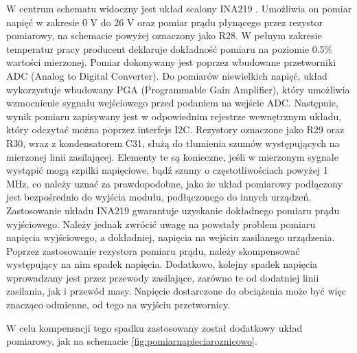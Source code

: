 W centrum schematu widoczny jest układ scalony INA219 \cite{ina219}. Umożliwia on pomiar napięć w zakresie 0 V do 26 V oraz pomiar prądu płynącego przez rezystor pomiarowy, na schemacie powyżej oznaczony 
jako R28.
W pełnym zakresie temperatur pracy producent deklaruje dokładność pomiaru na poziomie 0.5\% wartości mierzonej.
Pomiar dokonywany jest poprzez wbudowane przetworniki ADC (Analog to Digital Converter). Do pomiarów niewielkich napięć, układ wykorzystuje wbudowany 
PGA (Programmable Gain Amplifier), który umożliwia wzmocnienie sygnału wejściowego przed podaniem na wejście ADC. 
Następnie, wynik pomiaru zapisywany jest w odpowiednim rejestrze wewnętrznym układu, który odczytać można poprzez interfejs I2C.
Rezystory oznaczone jako R29 oraz R30, wraz z kondensatorem C31, służą do tłumienia szumów występujących na mierzonej linii zasilającej.
Elementy te są konieczne, jeśli w mierzonym sygnale wystąpić mogą szpilki napięciowe, bądź szumy o częstotliwościach powyżej 1 MHz, co należy uznać za prawdopodobne, jako że układ pomiarowy podłączony jest bezpośrednio do wyjścia 
modułu, podłączonego do innych urządzeń. \\


Zastosowanie układu INA219 gwarantuje uzyskanie dokładnego pomiaru prądu wyjściowego. Należy jednak zwrócić uwagę na powstały problem pomiaru napięcia wyjściowego, a dokładniej, napięcia na wejściu zasilanego urządzenia.
Poprzez zastosowanie rezystora pomiaru prądu, należy skompensować występujący na nim spadek napięcia. Dodatkowo, kolejny spadek napięcia wprowadzany jest przez przewody zasilające, 
zarówno te od dodatniej linii zasilania, jak i przewód masy. Napięcie dostarczone do obciążenia może być więc znacząco odmienne, od tego na wyjściu przetwornicy.

W celu kompensacji tego spadku zastosowany został dodatkowy układ pomiarowy, jak na schemacie \ref{fig:pomiarnapieciaroznicowo}.

